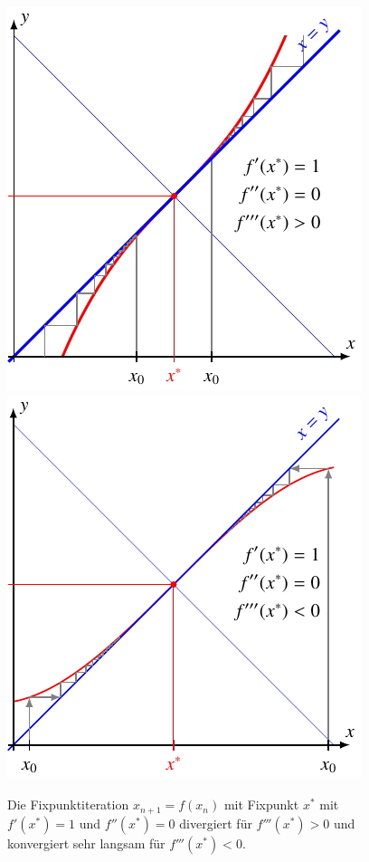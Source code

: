 %
%
%
\begin{figure}
\centering
\includegraphics{chapters/10-arithmetik/figures/m1kp.pdf}
\includegraphics{chapters/10-arithmetik/figures/m1kn.pdf}
\caption{Die Fixpunktiteration $x_{n+1}=f(x_n)$ mit Fixpunkt $x^*$
mit $f'(x^*)=1$ und $f''(x^*)=0$ divergiert für $f'''(x^*)>0$
und konvergiert sehr langsam für $f'''(x^*)<0$.
\label{buch:figure:fixpunkt:abl1kub}}
\end{figure}
%

